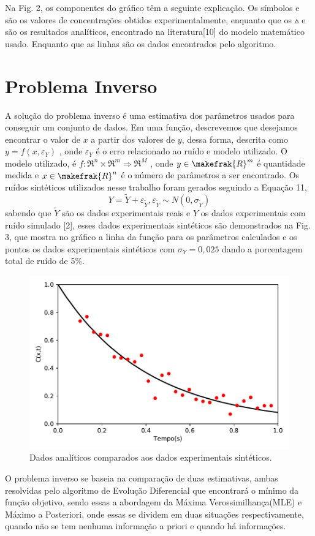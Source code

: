 \documentclass[por]{Template_SBEF}
\begin{document}
Na Fig. 2, os componentes do gráfico têm a seguinte explicação. Os símbolos  e  são os valores de concentrações obtidos experimentalmente, enquanto que os $\vartriangle$ e  são os resultados analíticos, encontrado na literatura[10] do modelo matemático usado. Enquanto que as linhas são os dados encontrados pelo algoritmo.
\section{Problema Inverso}
A solução do problema inverso é uma estimativa dos parâmetros usados para conseguir um conjunto de dados. Em uma função, descrevemos que desejamos encontrar o valor de $x$ a partir dos valores de $y$, dessa forma, descrita como $y = f(x, \varepsilon_Y)$ , onde $\varepsilon_Y$ é o erro relacionado ao ruído e modelo utilizado. O modelo utilizado, é $f:\mathfrak{R}^n \times \mathfrak{R}^m \Rightarrow \mathfrak{R}^M$ 
, onde $y \in \makefrak{R}^m$ é quantidade medida e $x \in \makefrak{R}^n$ é o número de parâmetros a ser encontrado. Os ruídos sintéticos utilizados nesse trabalho foram gerados seguindo a Equação 11,
\begin{equation}
Y = \widetilde{Y} + \varepsilon_{\widetilde{Y}}, \varepsilon_{\widetilde{Y}} \sim N(0, \sigma_{\widetilde{Y}})
\end{equation}
sabendo que $\widetilde{Y}$ são os dados experimentais reais e $Y$ os dados experimentais com ruído simulado [2], esses dados experimentais sintéticos são demonstrados na Fig. 3, que mostra no gráfico a linha da função para os parâmetros calculados e os pontos os dados experimentais sintéticos com $\sigma_Y = 0,025$ dando a porcentagem total de ruído de 5\%.
\begin{figure}[!tb] 
	\centering
	\includegraphics[width=.8\columnwidth]{Arquivos/plot.pdf} 
	\caption{Dados analíticos comparados aos dados experimentais sintéticos.} 
\end{figure}
O problema inverso se baseia na comparação de duas estimativas,  ambas resolvidas pelo algoritmo de Evolução Diferencial que encontrará o mínimo da função objetivo, sendo essas a abordagem da Máxima Verossimilhança(MLE) e Máximo a Posteriori, onde essas se dividem em duas situações respectivamente,  quando não se tem nenhuma informação a priori e quando há informações.
\end{document}
